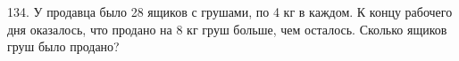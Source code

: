 134. У продавца было 28 ящиков с грушами, по 4 кг в каждом. К концу рабочего дня оказалось, что продано на 8 кг груш больше, чем осталось. Сколько ящиков груш было продано?\\
